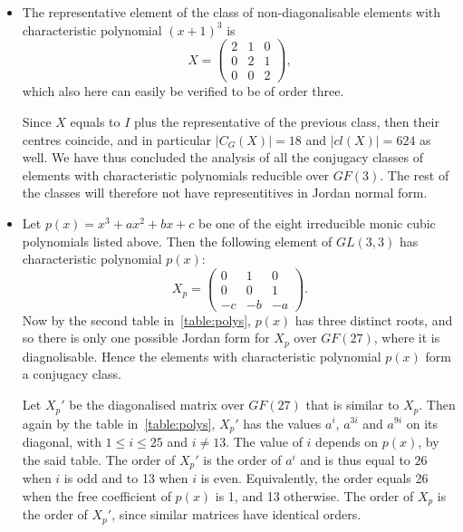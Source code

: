 \documentclass[11pt]{article} \usepackage{amssymb}
\begin{document}
\begin{enumerate}
\begin{enumerate}
\begin{itemize}
      \item
        The representative element of the class of non-diagonalisable
        elements with characteristic polynomial $(x+1)^3$ is
        \begin{equation*}
          X=
          \begin{pmatrix}
            2&1  &0 \\ 
            0&2  &1 \\ 
            0&0  &2 
          \end{pmatrix},
        \end{equation*}
        which also here can easily be verified to be of order three.
        
        Since $X$ equals to $I$ plus the representative of the previous class, 
        then their centres coincide, and in particular $|C_G(X)|=18$ and
        $|cl(X)|=624$ as well. We have thus concluded the analysis of all the
        conjugacy classes of elements with characteristic polynomials 
        reducible over $GF(3)$. The rest of the classes will therefore not have
        representitives in Jordan normal form.

      \item
        Let $p(x)=x^3+ax^2+bx+c$ be one of the eight irreducible monic 
        cubic polynomials listed above. Then the following element
        of $GL(3,3)$ has characteristic polynomial $p(x)$:
        \begin{equation*}
          X_p=
          \begin{pmatrix}
            0&1  &0 \\ 
            0&0  &1 \\ 
            -c&-b  &-a 
          \end{pmatrix}.
        \end{equation*}
        Now by the second table in~\ref{table:polys}, $p(x)$ has three 
        distinct roots, and so there is only one possible Jordan form for $X_p$
        over $GF(27)$, where it is diagnolisable.
        Hence the elements with characteristic polynomial $p(x)$
        form a conjugacy class.
        
        Let $X_p'$ be the diagonalised matrix over $GF(27)$ that is similar
        to $X_p$. Then again by the table in~\ref{table:polys}, $X_p'$ has
        the values $a^i$, $a^{3i}$ and $a^{9i}$ on its diagonal, with $1 \leq i \leq 25$ and
        $i \neq 13$. The value of $i$ depends on $p(x)$, by the said table.
        The order of $X_p'$ is the order of $a^i$
        and is thus equal to $26$ when $i$ is odd and to 13 when $i$ is even.
        Equivalently, the order equals
        26 when the free coefficient of $p(x)$ is 1, and 13 otherwise.
        The order of $X_p$ is the order of $X_p'$, 
        since similar matrices have identical orders.


\end{itemize}
\end{enumerate}
\end{enumerate}
\end{document}
